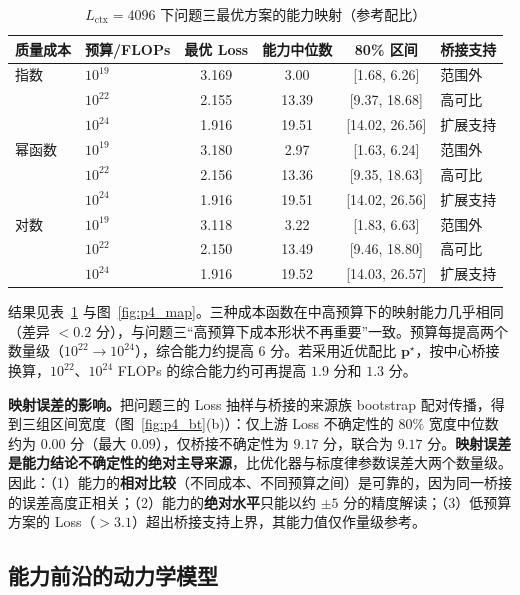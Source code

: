 \begin{table}[htbp]
\centering
\small
\caption{$L_{\mathrm{ctx}}=4096$ 下问题三最优方案的能力映射（参考配比）}
\label{tab:p4_map}
\begin{tabular}{llcccl}
\toprule
质量成本 & 预算/FLOPs & 最优 Loss & 能力中位数 & 80\% 区间 & 桥接支持 \\
\midrule
指数 & $10^{19}$ & 3.169 & 3.00 & [1.68, 6.26] & 范围外 \\
 & $10^{22}$ & 2.155 & 13.39 & [9.37, 18.68] & 高可比 \\
 & $10^{24}$ & 1.916 & 19.51 & [14.02, 26.56] & 扩展支持 \\
\midrule
幂函数 & $10^{19}$ & 3.180 & 2.97 & [1.63, 6.24] & 范围外 \\
 & $10^{22}$ & 2.156 & 13.36 & [9.35, 18.63] & 高可比 \\
 & $10^{24}$ & 1.916 & 19.51 & [14.02, 26.56] & 扩展支持 \\
\midrule
对数 & $10^{19}$ & 3.118 & 3.22 & [1.83, 6.63] & 范围外 \\
 & $10^{22}$ & 2.150 & 13.49 & [9.46, 18.80] & 高可比 \\
 & $10^{24}$ & 1.916 & 19.52 & [14.03, 26.57] & 扩展支持 \\
\bottomrule
\end{tabular}
\end{table}

结果见表~\ref{tab:p4_map} 与图~\ref{fig:p4_map}。三种成本函数在中高预算下的映射能力几乎相同（差异 $<0.2$ 分），与问题三“高预算下成本形状不再重要”一致。预算每提高两个数量级（$10^{22}\to10^{24}$），综合能力约提高 $6$ 分。若采用近优配比 $\boldsymbol p^\star$，按中心桥接换算，$10^{22}$、$10^{24}$ FLOPs 的综合能力约可再提高 $1.9$ 分和 $1.3$ 分。

\textbf{映射误差的影响。}把问题三的 Loss 抽样与桥接的来源族 bootstrap 配对传播，得到三组区间宽度（图~\ref{fig:p4_bt}(b)）：仅上游 Loss 不确定性的 $80\%$ 宽度中位数约为 $0.00$ 分（最大 $0.09$），仅桥接不确定性为 $9.17$ 分，联合为 $9.17$ 分。\textbf{映射误差是能力结论不确定性的绝对主导来源}，比优化器与标度律参数误差大两个数量级。因此：（1）能力的\textbf{相对比较}（不同成本、不同预算之间）是可靠的，因为同一桥接的误差高度正相关；（2）能力的\textbf{绝对水平}只能以约 $\pm5$ 分的精度解读；（3）低预算方案的 Loss（$>3.1$）超出桥接支持上界，其能力值仅作量级参考。

\subsection{能力前沿的动力学模型}

